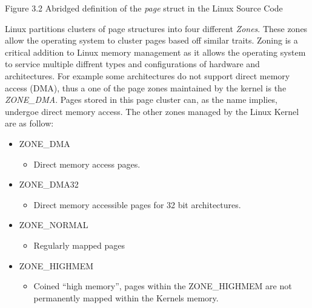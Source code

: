 
\begin{center}
Figure 3.2 Abridged definition of the \textit{page} struct in the Linux Source Code
\end{center}
	
	  \normalfont \indent Linux partitions clusters of page structures into four different \textit{Zones}\cite{Love_book}. These zones allow the operating system to cluster pages based off similar traits. Zoning is a critical addition to Linux memory management as it allows the operating system to service multiple diffrent types and configurations of hardware and architectures. For example some architectures do not support direct memory access (DMA), thus a one of the page zones maintained by the kernel is the \textit{ZONE\_DMA}. Pages stored in this page cluster can, as the name implies, undergoe direct memory access. The other zones managed by the Linux Kernel are as follow: 
	  
	\begin{itemize}
		\item ZONE\_DMA
			\begin{itemize}
				\item Direct memory access pages.
			\end{itemize}
		\item ZONE\_DMA32 
			\begin{itemize}
				\item Direct memory accessible pages for 32 bit architectures.
			\end{itemize}
		\item ZONE\_NORMAL
			\begin{itemize}
				\item Regularly mapped pages
			\end{itemize}
		\item ZONE\_HIGHMEM
			\begin{itemize}
				\item Coined “high memory”, pages within the ZONE\_HIGHMEM are not permanently mapped within the Kernels memory. 
			\end{itemize}
	\end{itemize} 

